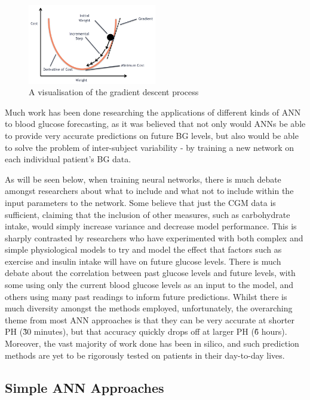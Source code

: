       \begin{figure}[H]
        \centering
        \includegraphics[width=0.5\textwidth]{images/gradientdescent.png}
        \caption{
         A visualisation of the gradient descent process\cite{whatisgdimage}
        }
      \end{figure}
      Much work has been done researching the applications of different kinds of ANN to blood glucose forecasting, as it was believed that not only would ANNs be able to provide very accurate predictions on future BG levels, but also would be able to solve the problem of inter-subject variability - by training a new network on each individual patient's BG data. 

      As will be seen below, when training neural networks, there is much debate amongst researchers about what to include and what not to include within the input parameters to the network. Some believe that just the CGM data is sufficient, claiming that the inclusion of other measures, such as carbohydrate intake, would simply increase variance and decrease model performance. This is sharply contrasted by researchers who have experimented with both complex and simple physiological models to try and model the effect that factors such as exercise and insulin intake will have on future glucose levels. There is much debate about the correlation between past glucose levels and future levels, with some using only the current blood glucose levels as an input to the model, and others using many past readings to inform future predictions. Whilst there is much diversity amongst the methods employed, unfortunately, the overarching theme from most ANN approaches is that they can be very accurate at shorter PH (\~30 minutes), but that accuracy quickly drops off at larger PH (\~6 hours). Moreover, the vast majority of work done has been in silico, and such prediction methods are yet to be rigorously tested on patients in their day-to-day lives.

      \subsection{Simple ANN Approaches}

